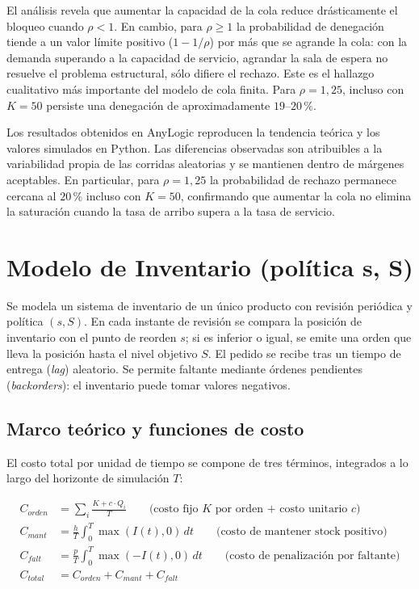 \documentclass{article}
\begin{document}
El análisis revela que aumentar la capacidad de la cola reduce
drásticamente el bloqueo cuando $\rho < 1$. En cambio, para $\rho \geq 1$
la probabilidad de denegación tiende a un valor límite positivo
($1-1/\rho$) por más que se agrande la cola: con la demanda superando a la
capacidad de servicio, agrandar la sala de espera no resuelve el problema
estructural, sólo difiere el rechazo. Este es el hallazgo cualitativo más
importante del modelo de cola finita. Para $\rho=1{,}25$, incluso con
$K=50$ persiste una denegación de aproximadamente $19$--$20\,\%$.

Los resultados obtenidos en AnyLogic reproducen la tendencia teórica y los
valores simulados en Python. Las diferencias observadas son atribuibles a
la variabilidad propia de las corridas aleatorias y se mantienen dentro de
márgenes aceptables. En particular, para $\rho=1{,}25$ la probabilidad de
rechazo permanece cercana al $20\,\%$ incluso con $K=50$, confirmando que
aumentar la cola no elimina la saturación cuando la tasa de arribo supera a
la tasa de servicio.

\section{Modelo de Inventario (política s, S)}

Se modela un sistema de inventario de un único producto con revisión
periódica y política $(s,S)$. En cada instante de revisión se compara la
posición de inventario con el punto de reorden $s$; si es inferior o igual, se
emite una orden que lleva la posición hasta el nivel objetivo $S$. El
pedido se recibe tras un tiempo de entrega (\textit{lag}) aleatorio. Se
permite faltante mediante órdenes pendientes (\textit{backorders}): el
inventario puede tomar valores negativos.

\subsection{Marco teórico y funciones de costo}

El costo total por unidad de tiempo se compone de tres términos,
integrados a lo largo del horizonte de simulación $T$:

\begin{align}
    C_{orden} &= \sum_i \frac{K + c\cdot Q_i}{T}
    \qquad \text{(costo fijo $K$ por orden + costo unitario $c$)} \\
    C_{mant} &= \frac{h}{T}\int_0^T \max(I(t),0)\,dt
    \qquad \text{(costo de mantener stock positivo)} \\
    C_{falt} &= \frac{p}{T}\int_0^T \max(-I(t),0)\,dt
    \qquad \text{(costo de penalización por faltante)} \\
    C_{total} &= C_{orden} + C_{mant} + C_{falt}
\end{align}
\end{document}
